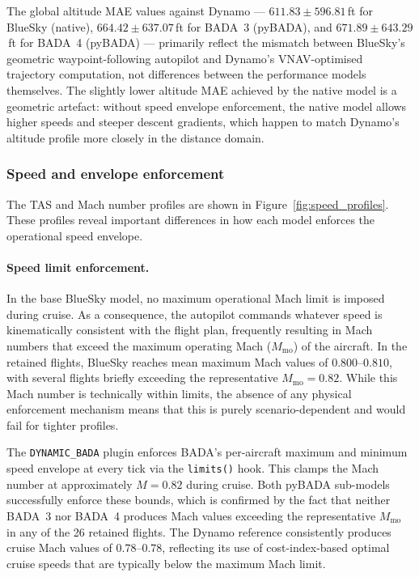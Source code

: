 The global altitude MAE values against Dynamo --- $611.83 \pm 596.81$\,ft for BlueSky (native), $664.42 \pm 637.07$\,ft for BADA~3 (pyBADA), and $671.89 \pm 643.29$\,ft for BADA~4 (pyBADA) --- primarily reflect the mismatch between BlueSky's geometric waypoint-following autopilot and Dynamo's VNAV-optimised trajectory computation, not differences between the performance models themselves. The slightly lower altitude MAE achieved by the native model is a geometric artefact: without speed envelope enforcement, the native model allows higher speeds and steeper descent gradients, which happen to match Dynamo's altitude profile more closely in the distance domain.


\subsubsection{Speed and envelope enforcement}

The TAS and Mach number profiles are shown in Figure~\ref{fig:speed_profiles}. These profiles reveal important differences in how each model enforces the operational speed envelope.

\paragraph{Speed limit enforcement.}
In the base BlueSky model, no maximum operational Mach limit is imposed during cruise. As a consequence, the autopilot commands whatever speed is kinematically consistent with the flight plan, frequently resulting in Mach numbers that exceed the maximum operating Mach ($M_{\text{mo}}$) of the aircraft. In the retained flights, BlueSky reaches mean maximum Mach values of $0.800$--$0.810$, with several flights briefly exceeding the representative $M_{\text{mo}} = 0.82$. While this Mach number is technically within limits, the absence of any physical enforcement mechanism means that this is purely scenario-dependent and would fail for tighter profiles.

The \texttt{DYNAMIC\_BADA} plugin enforces BADA's per-aircraft maximum and minimum speed envelope at every tick via the \texttt{limits()} hook. This clamps the Mach number at approximately $M = 0.82$ during cruise. Both pyBADA sub-models successfully enforce these bounds, which is confirmed by the fact that neither BADA~3 nor BADA~4 produces Mach values exceeding the representative $M_{\text{mo}}$ in any of the 26 retained flights. The Dynamo reference consistently produces cruise Mach values of $0.78$--$0.78$, reflecting its use of cost-index-based optimal cruise speeds that are typically below the maximum Mach limit.

